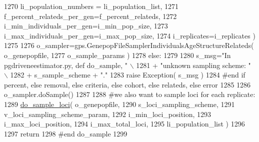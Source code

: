 \begin{DoxyCode}
1270                                         li\_population\_numbers = li\_population\_list,
1271                                         f\_percent\_relateds\_per\_gen=f\_percent\_relateds,
1272                                         i\_min\_individuals\_per\_gen=i\_min\_pop\_size,
1273                                         i\_max\_individuals\_per\_gen=i\_max\_pop\_size,
1274                                         i\_replicates=i\_replicates )
1275 
1276             o\_sampler=gps.GenepopFileSamplerIndividualsAgeStructureRelateds( o\_genepopfile,
1277                                                                     o\_sample\_params )
1278     \textcolor{keywordflow}{else}:
1279 
1280         s\_msg=\textcolor{stringliteral}{"In pgdriveneestimator.py, def do\_sample, "} \(\backslash\)
1281                 + \textcolor{stringliteral}{"unknown sampling scheme: "} \(\backslash\)
1282                 + s\_sample\_scheme + \textcolor{stringliteral}{"."}
1283         \textcolor{keywordflow}{raise} Exception( s\_msg )
1284     \textcolor{comment}{#end if percent, else removal, else criteria, else cohort, else relateds, else error}
1285 
1286     o\_sampler.doSample()
1287 
1288     \textcolor{comment}{#we also want to sample loci for each replicate:}
1289     \hyperlink{namespacenegui_1_1pgdriveneestimator_afe018505bc1f9a64aa804139954ae5f1}{do\_sample\_loci}( o\_genepopfile,
1290                     s\_loci\_sampling\_scheme,
1291                     v\_loci\_sampling\_scheme\_param,
1292                     i\_min\_loci\_position,
1293                     i\_max\_loci\_position,
1294                     i\_max\_total\_loci,
1295                     li\_population\_list )
1296 
1297     \textcolor{keywordflow}{return}
1298 \textcolor{comment}{#end do\_sample}
1299 
\end{DoxyCode}
